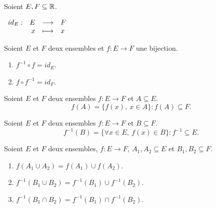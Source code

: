\begin{definition}
    Soient $E, F \subseteq \mathbb{R}$.
	\begin{center}
		$
		\begin{array}{rrcl} id_E : & E & \longrightarrow & F \\ & x & \longmapsto & x \end{array}
		$
	\end{center}
\end{definition}

\begin{proposition}
	Soient $E$ et $F$ deux ensembles et $f : E \to F$ une bijection.
    \begin{multicols}{2}
        \begin{enumerate}
            \item $f^{-1} \circ f = id_E$.
            \item $f \circ f^{-1} = id_F$.
        \end{enumerate}
    \end{multicols}
\end{proposition}

\begin{definition}
    Soient $E$ et $F$ deux ensembles $f : E \to F$ et $A \subseteq E$.
	\[ f(A) = \{ f(x),\ x \in A \} : f(A) \subseteq F. \]
\end{definition}

\begin{definition}
	Soient $E$ et $F$ deux ensembles $f : E \to F$ et $B \subseteq F$.
	\[ f^{-1}(B) = \{ \forall x \in E,\ f(x) \in B \} : f^{-1} \subseteq E. \]
\end{definition}

\begin{proposition}
    Soient $E$ et $F$ deux ensembles, $f : E \to F,\ A_1, A_2 \subseteq E$ et $B_1, B_2 \subseteq F$.
    \begin{enumerate}
        \item $f(A_1 \cup A_2) = f(A_1) \cup f(A_2)$.
        \item $f^{-1} (B_1 \cup B_2) = f^{-1} (B_1) \cup f^{-1} (B_2)$.
        \item $f^{-1} (B_1 \cap B_2) = f^{-1} (B_1) \cap f^{-1} (B_2)$.
    \end{enumerate}
\end{proposition} 

